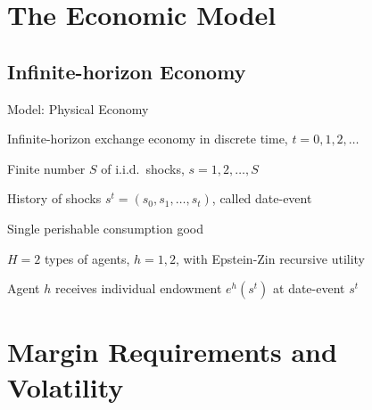 \documentclass[large]{beamer}
\begin{document}
%
\section{The Economic Model}
%
\subsection{Infinite-horizon Economy}
%
\begin{frame}{Model: Physical Economy}

Infinite-horizon exchange economy in discrete time, $t=0,1,2,\ldots$

\bigskip

Finite number $S$ of i.i.d.\ shocks, $s=1,2,\ldots,S$

\bigskip

History of shocks $s^t =(s_0,s_1,\ldots,s_t)$, called date-event

\bigskip

Single perishable consumption good

\bigskip

$H=2$ types of agents, $h=1,2$, with Epstein-Zin recursive utility

\bigskip

Agent {\color{blue} $h$} receives individual endowment {\color{blue} $e^h(s^t)$} at date-event $s^t$

\end{frame}
%
\section{Margin Requirements and Volatility}
%
\end{document}
